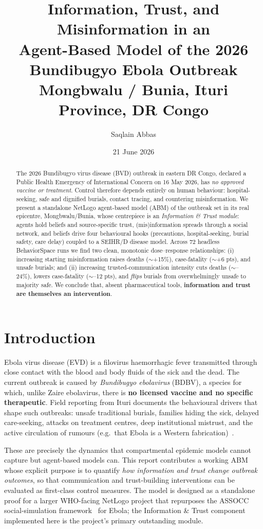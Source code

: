 \documentclass[11pt]{article}
\title{\textbf{Information, Trust, and Misinformation in an\\ Agent-Based Model of the 2026 Bundibugyo Ebola Outbreak}\\[4pt]
\large Mongbwalu / Bunia, Ituri Province, DR Congo}
\author[1]{Saqlain Abbas}
\affil[1]{NetLogo agent-based modelling; built and analysed with Claude (Opus 4.8) via the NetLogo MCP server}
\date{21 June 2026}
\begin{document}
\maketitle

\begin{abstract}
\noindent The 2026 Bundibugyo virus disease (BVD) outbreak in eastern DR Congo, declared a Public Health Emergency of International Concern on 16 May 2026, has \emph{no approved vaccine or treatment}. Control therefore depends entirely on human behaviour: hospital-seeking, safe and dignified burials, contact tracing, and countering misinformation. We present a standalone NetLogo agent-based model (ABM) of the outbreak set in its real epicentre, Mongbwalu/Bunia, whose centrepiece is an \emph{Information \& Trust module}: agents hold beliefs and source-specific trust, (mis)information spreads through a social network, and beliefs drive four behavioural hooks (precautions, hospital-seeking, burial safety, care delay) coupled to a SEIHR/D disease model. Across 72 headless BehaviorSpace runs we find two clean, monotonic dose--response relationships: (i) increasing starting misinformation raises deaths ($\sim$+15\%), case-fatality ($\sim$+6 pts), and unsafe burials; and (ii) increasing trusted-communication intensity cuts deaths ($\sim$--24\%), lowers case-fatality ($\sim$--12 pts), and \emph{flips} burials from overwhelmingly unsafe to majority safe. We conclude that, absent pharmaceutical tools, \textbf{information and trust are themselves an intervention}.
\end{abstract}

\section{Introduction}
Ebola virus disease (EVD) is a filovirus haemorrhagic fever transmitted through close contact with the blood and body fluids of the sick and the dead. The current outbreak is caused by \emph{Bundibugyo ebolavirus} (BDBV), a species for which, unlike Zaire ebolavirus, there is \textbf{no licensed vaccine and no specific therapeutic}. Field reporting from Ituri documents the behavioural drivers that shape such outbreaks: unsafe traditional burials, families hiding the sick, delayed care-seeking, attacks on treatment centres, deep institutional mistrust, and the active circulation of rumours (e.g.\ that Ebola is a Western fabrication)~\cite{who2026,cdc2026}.

These are precisely the dynamics that compartmental epidemic models cannot capture but agent-based models can. This report contributes a working ABM whose explicit purpose is to quantify \emph{how information and trust change outbreak outcomes}, so that communication and trust-building interventions can be evaluated as first-class control measures. The model is designed as a standalone proof for a larger WHO-facing NetLogo project that repurposes the ASSOCC social-simulation framework~\cite{assocc} for Ebola; the Information \& Trust component implemented here is the project's primary outstanding module.
\end{document}
